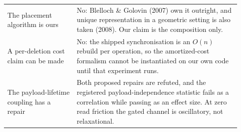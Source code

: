 \documentclass{article}
\begin{document}
{\begin{center}
\begin{tabular}{p{0.28\linewidth}p{0.66\linewidth}}
The placement algorithm is ours & No: Blelloch \& Golovin (2007) own it outright, and unique representation in a geometric setting is also taken (2008). Our claim is the composition only.\\
A per-deletion cost claim can be made & No: the shipped synchronisation is an $O(n)$ rebuild per operation, so the amortized-cost formalism cannot be instantiated on our own code until that experiment runs.\\
The payload-lifetime coupling has a repair & Both proposed repairs are refuted, and the registered payload-independence statistic fails as a correlation while passing as an effect size. At zero read friction the gated channel is oscillatory, not relaxational.\\
\bottomrule
\end{tabular}


\end{center}}
\end{document}
